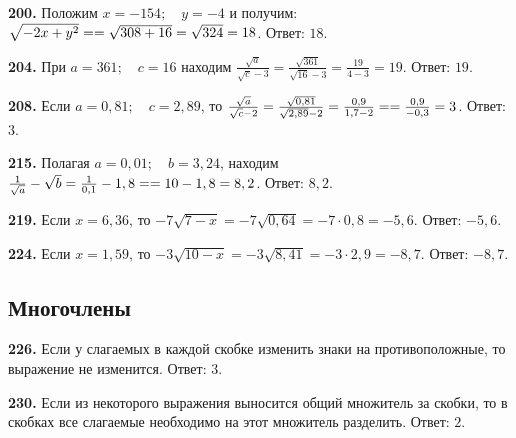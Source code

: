 \textbf{200.} Положим $x=-154;\quad y=-4$ и получим: 
$\sqrt{-2x+y^2}=\linebreak=\sqrt{308+16}=\sqrt{324}=18$. \newline \null \hspace*{\fill} Ответ: $18$. 

\textbf{204.} При $a=361;\quad c=16$ находим $\frac{\sqrt{a}}{\sqrt{c}-3}=\frac{\sqrt{361}}{\sqrt{16}-3}=\frac{19}{4-3}=19$. \newline \null \hspace*{\fill} Ответ: $19$. 

\textbf{208.} Если $a=0,81;\quad c=2,89$, то $\frac{\sqrt{a}}{\sqrt{c}-2}=\frac{\sqrt{0,81}}{\sqrt{2,89}-2}=\frac{0,9}{1,7-2}=\linebreak=\frac{0,9}{-0,3}=3$. \newline \null \hspace*{\fill} Ответ: $3$. 

\textbf{215.} Полагая $a=0,01;\quad b=3,24$, находим $\frac{1}{\sqrt{a}}-\sqrt{b}=\frac{1}{0,1}-1,8=\linebreak=10-1,8=8,2$. \newline \null \hspace*{\fill} Ответ: $8,2$.  

\textbf{219.} Если  $x=6,36$, то $-7\sqrt{7-x}=-7\sqrt{0,64}=-7\cdot0,8=-5,6$.\newline \null \hspace*{\fill} Ответ: $-5,6$. 

\textbf{224.} Если $x=1,59$, то $-3\sqrt{10-x}=-3\sqrt{8,41}=-3\cdot2,9=-8,7$. \newline \null \hspace*{\fill} Ответ: $-8,7$. 

\subsection{Многочлены}


\textbf{226.} Если у слагаемых в каждой  скобке  изменить знаки на противоположные,  то выражение не изменится. \newline \null \hspace*{\fill} Ответ: $3$. 

\textbf{230.} Если из некоторого выражения выносится общий множитель за скобки, то в скобках все слагаемые необходимо на этот множитель разделить. \newline \null \hspace*{\fill} Ответ: $2$. 

